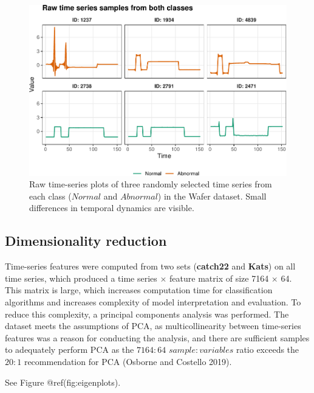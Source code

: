 \documentclass{article}
\begin{document}
\begin{figure}
\centering
\includegraphics{olet5610_report_files/figure-latex/tsplots-1.pdf}
\caption{Raw time-series plots of three randomly selected time series
from each class (\(Normal\) and \(Abnormal\)) in the Wafer dataset.
Small differences in temporal dynamics are visible.}
\end{figure}

\hypertarget{dimensionality-reduction}{%
\subsection{Dimensionality reduction}\label{dimensionality-reduction}}

Time-series features were computed from two sets (\textbf{catch22} and
\textbf{Kats}) on all time series, which produced a time series
\(\times\) feature matrix of size 7164 \(\times\) 64. This matrix is
large, which increases computation time for classification algorithms
and increases complexity of model interpretation and evaluation. To
reduce this complexity, a principal components analysis was performed.
The dataset meets the assumptions of PCA, as multicollinearity between
time-series features was a reason for conducting the analysis, and there
are sufficient samples to adequately perform PCA as the \(7164:64\)
\(sample:variables\) ratio exceeds the \(20:1\) recommendation for PCA
(Osborne and Costello 2019).

See Figure @ref(fig:eigenplots).
\end{document}
